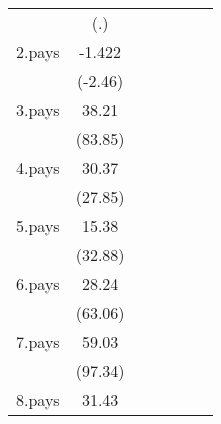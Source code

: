 {\begin{tabular}{l*{6}{c}}
                    &         (.)         &                     &                     &                     &                     &                     \\
[1em]
2.pays              &      -1.422\sym{*}  &                     &                     &                     &                     &                     \\
                    &     (-2.46)         &                     &                     &                     &                     &                     \\
[1em]
3.pays              &       38.21\sym{***}&                     &                     &                     &                     &                     \\
                    &     (83.85)         &                     &                     &                     &                     &                     \\
[1em]
4.pays              &       30.37\sym{***}&                     &                     &                     &                     &                     \\
                    &     (27.85)         &                     &                     &                     &                     &                     \\
[1em]
5.pays              &       15.38\sym{***}&                     &                     &                     &                     &                     \\
                    &     (32.88)         &                     &                     &                     &                     &                     \\
[1em]
6.pays              &       28.24\sym{***}&                     &                     &                     &                     &                     \\
                    &     (63.06)         &                     &                     &                     &                     &                     \\
[1em]
7.pays              &       59.03\sym{***}&                     &                     &                     &                     &                     \\
                    &     (97.34)         &                     &                     &                     &                     &                     \\
[1em]
8.pays              &       31.43\sym{***}&                     &                     &                     &                     &                     \\

\end{tabular}}
